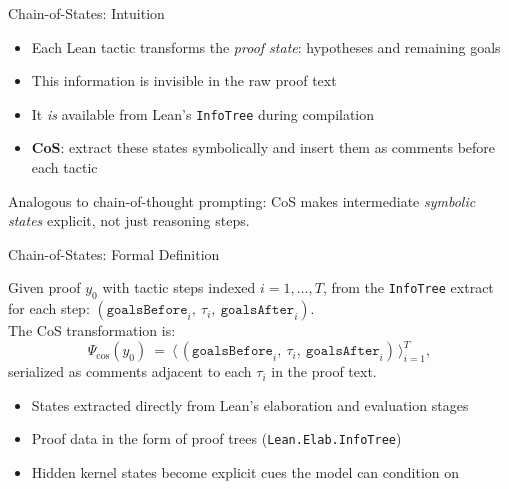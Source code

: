 \begin{frame}{Chain-of-States: Intuition}
\vspace{0.8em}
\begin{itemize}\setlength{\itemsep}{10pt}
  \item Each Lean tactic transforms the \emph{proof state}: hypotheses and remaining goals
  \item This information is invisible in the raw proof text
  \item It \emph{is} available from Lean's \texttt{InfoTree} during compilation
  \item \textbf{CoS}: extract these states symbolically and insert them as comments before each tactic
\end{itemize}
\vspace{0.8em}
\begin{exampleblock}{}
  Analogous to chain-of-thought prompting: CoS makes intermediate \emph{symbolic states} explicit, not just reasoning steps.
\end{exampleblock}
\end{frame}

\begin{frame}{Chain-of-States: Formal Definition}
\vspace{0.4em}
\begin{definition}
Given proof $y_0$ with tactic steps indexed $i=1,\dots,T$, from the \texttt{InfoTree} extract for each step:
$(\texttt{goalsBefore}_i,\ \tau_i,\ \texttt{goalsAfter}_i)$.\\[0.4em]
The CoS transformation is:
\[
  \Psi_{\text{cos}}(y_0)\ =\ \bigl\langle\,(\texttt{goalsBefore}_i,\ \tau_i,\ \texttt{goalsAfter}_i)\,\bigr\rangle_{i=1}^T,
\]
serialized as comments adjacent to each $\tau_i$ in the proof text.
\end{definition}
\vspace{0.5em}
\begin{itemize}\setlength{\itemsep}{6pt}
  \item States extracted directly from Lean's elaboration and evaluation stages
  \item Proof data in the form of proof trees (\texttt{Lean.Elab.InfoTree})
  \item Hidden kernel states become explicit cues the model can condition on
\end{itemize}
\end{frame}

